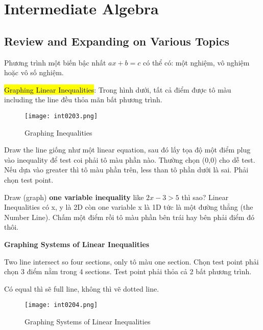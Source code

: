 \chapter{Intermediate Algebra}

\section{Review and Expanding on Various Topics}

Phương trình một biến bậc nhất $ax+b=c$ có thể có: một nghiệm, vô nghiệm hoặc vô số nghiệm.

\vspace{.5cm}

\hl{Graphing Linear Inequalities}: Trong hình dưới, tất cả điểm được tô màu including the line đều thỏa mãn bất phương trình.

\begin{figure}[htb!]
  \centering
  \texttt{[image: int0203.png]}
  \caption{Graphing Inequalities}
\end{figure}

Draw the line giống như một linear equation, sau đó lấy tọa độ một điểm plug vào inequality để test coi phải tô màu phần nào. Thường chọn (0,0) cho dễ test. Nếu dựa vào greater thì tô màu phần trên, less than tô phần dưới là sai. Phải chọn test point.

\vspace{.5cm}

Draw (graph) \textbf{one variable inequality} like $2x-3>5$ thì sao? Linear Inequalities có x, y là 2D còn one variable x là 1D tức là một đường thẳng (the Number Line). Chấm một điểm rồi tô màu phần bên trái hay bên phải điểm đó thôi.

\vspace{0.6 cm}

\centerline{\textbf{\Large Graphing Systems of Linear Inequalities}}

\vspace{0.3 cm}

Two line intersect so four sections, only tô màu one section. Chọn test point phải chọn 3 điểm nằm trong 4 sections. Test point phải thỏa cả 2 bất phương trình.

Có equal thì sẽ full line, không thì vẽ dotted line.

\begin{figure}[htb!]
  \centering
  \texttt{[image: int0204.png]}
  \caption{Graphing Systems of Linear Inequalities}
\end{figure}

